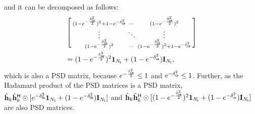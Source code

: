 \documentclass[draftclsnofoot, onecolumn, comsoc, 12pt]{IEEEtran}
\begin{document}
and it can be decomposed as follows:
\begin{align} \label{APPENB7}
   &\left[ \begin{smallmatrix}
   (1-e^{-\frac{\delta_{\sf{ce}}^{2}}{2}})^2 + 1 - e^{-\delta_{\sf{ce}}^{2}}&\cdots&(1-e^{-\frac{\delta_{\sf{ce}}^{2}}{2}})^2 \\ 
   \vdots&\ddots&\vdots\\
   (1-e^{-\frac{\delta_{\sf{ce}}^{2}}{2}})^2&\cdots&(1-e^{-\frac{\delta_{\sf{ce}}^{2}}{2}})^2 + 1 - e^{-\delta_{\sf{ce}}^{2}}
   \end{smallmatrix} \right]
   \nonumber \\
   &= (1-e^{-\frac{\delta_{\sf{ce}}^{2}}{2}})^2\mathbf{1}_{N_{\sf{t}}} + (1 - e^{-\delta_{\sf{ce}}^{2}}) \mathbf{I}_{N_{\sf{t}}},
\end{align}
which is also a PSD matrix, because $e^{-\frac{\delta_{\sf{ce}}^{2}}{2}} \leq 1$ and $e^{-\delta_{\sf{ce}}^{2}} \leq 1$. 
Further, as the Hadamard product of the PSD matrices is a PSD matrix, $\hat{\mathbf{h}}_{k} \hat{\mathbf{h}}_{k}^{\sf{H}} \odot
    [e^{-\delta_{\sf{fb}}^{2}}\mathbf{1}_{N_{{\sf{t}}}} + (1-e^{-\delta_{\sf{fb}}^{2}})\mathbf{I}_{N_{{\sf{t}}}}]$ and $\hat{\mathbf{h}}_{k} \hat{\mathbf{h}}_{k}^{\sf{H}} \odot
    [(1-e^{-\frac{\delta_{\sf{ce}}^{2}}{2}})^{2}\mathbf{1}_{N_{{\sf{t}}}} + (1-e^{-\delta_{\sf{ce}}^{2}})\mathbf{I}_{N_{{\sf{t}}}}]$ are also PSD matrices.



\end{document}
